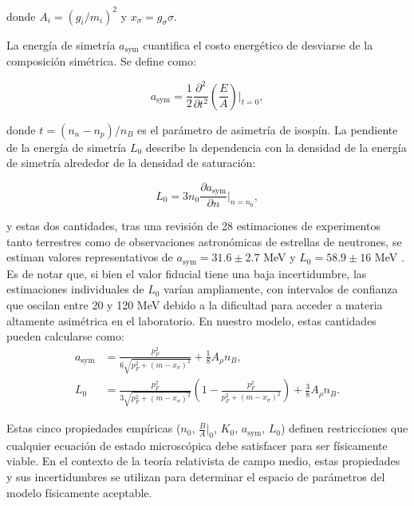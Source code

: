 donde $A_i = (g_i/m_i)^2$ y $x_\sigma = g_\sigma \sigma$. 

La energía de simetría $a_\text{sym}$ cuantifica el costo energético de desviarse de la composición simétrica. Se define como:

\begin{equation*}
	a_\text{sym} = \frac{1}{2} \frac{\partial^2}{\partial t^2}\left(\frac{E}{A}\right)\bigg|_{t=0},
\end{equation*}

donde $t = (n_n - n_p)/n_B$ es el parámetro de asimetría de isospín. La pendiente de la energía de simetría $L_0$ describe la dependencia con la densidad de la energía de simetría alrededor de la densidad de saturación:

\begin{equation*}
	L_0 = 3n_0 \frac{\partial a_\text{sym}}{\partial n}\bigg|_{n=n_0},
\end{equation*}

y estas dos cantidades, tras una revisión de 28 estimaciones de experimentos tanto terrestres como de observaciones astronómicas de estrellas de neutrones, se estiman valores representativos de $a_\text{sym} = 31.6 \pm 2.7$ MeV y $L_0 = 58.9 \pm 16$ MeV \cite{kumarTheoreticalExperimentalConstraints2024, liUnderstandingAstrophysicalEffects2019}. Es de notar que, si bien el valor fiducial tiene una baja incertidumbre, las estimaciones individuales de $L_0$ varían ampliamente, con intervalos de confianza que oscilan entre 20 y 120 MeV debido a la dificultad para acceder a materia altamente asimétrica en el laboratorio. En nuestro modelo, estas cantidades pueden calcularse como:
\vspace{-6pt}
\begin{align}
	a_\text{sym} &= \frac{p_F^2}{6\sqrt{p_F^2 + (m-x_\sigma)^2}} + \frac{1}{8}A_\rho n_B, \label{eq:energia_simetria} \\
	L_0 &= \frac{p_F^2}{3\sqrt{p_F^2 + (m-x_\sigma)^2}}\left(1 - \frac{p_F^2}{p_F^2 + (m-x_\sigma)^2}\right) + \frac{3}{8}A_\rho n_B. \label{eq:pendiente_simetria}
\end{align}

Estas cinco propiedades empíricas ($n_0$, $\frac{B}{A}\big|_0$, $K_0$, $a_\text{sym}$, $L_0$) definen restricciones que cualquier ecuación de estado microscópica debe satisfacer para ser físicamente viable. En el contexto de la teoría relativista de campo medio, estas propiedades y sus incertidumbres se utilizan para determinar el espacio de parámetros del modelo físicamente aceptable.


